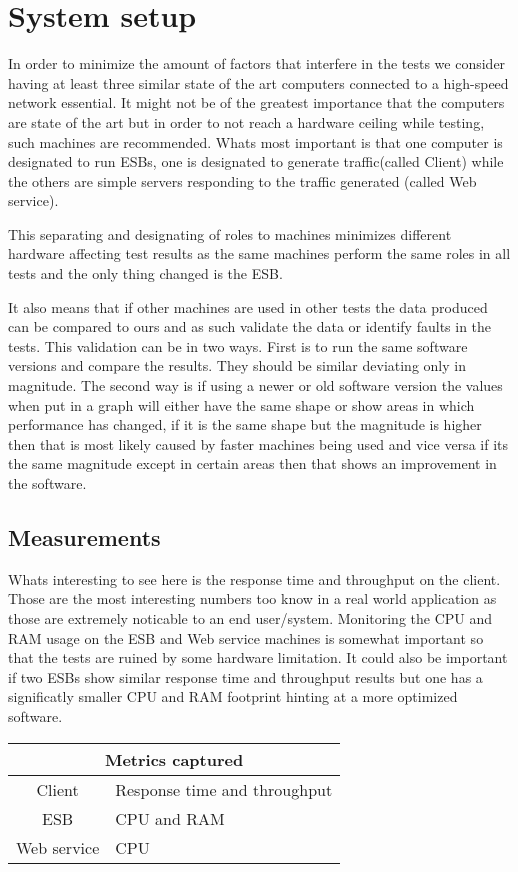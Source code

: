 \documentclass[11pt]{article} %
\begin{document}
\section{System setup}
 In order to minimize the amount of factors that interfere in the tests we consider having at least three similar state of the art computers connected to a high-speed network essential.
It might not be of the greatest importance that the computers are state of the art but in order to not reach a hardware ceiling while testing, such machines are recommended. Whats most important is that one computer is designated to run ESBs, one is designated to generate traffic(called Client) while the others are simple servers responding to the traffic generated (called Web service). 

This separating and designating of roles to machines minimizes different hardware affecting test results as the same machines perform the same roles in all tests and the only thing changed is the ESB. 

It also means that if other machines are used in other tests the data produced can be compared to ours and as such validate the data or identify faults in the tests. This validation can be in two ways. First is to run the same software versions and compare the results. They should be similar deviating only in magnitude. The second way is if using a newer or old software version the values when put in a graph will either have the same shape or show areas in which performance has changed, if it is the same shape but the magnitude is higher then that is most likely caused by faster machines being used and vice versa if its the same magnitude except in certain areas then that shows an improvement in the software.

\subsection{Measurements}
Whats interesting to see here is the response time and throughput on the client. Those are the most interesting numbers too know in a real world application as those are extremely noticable to an end user/system. Monitoring the CPU and RAM usage on the ESB and Web service machines is somewhat important so that the tests are ruined by some hardware limitation. It could also be important if two ESBs show similar response time and throughput results but one has a significatly smaller CPU and RAM footprint hinting at a more optimized software.

\begin{tabular}{| c | l |}
	\hline
	\multicolumn{2}{|c|}{Metrics captured} \\
	\hline
	Client & Response time and throughput \\ \hline
	ESB & CPU and RAM \\ \hline
	Web service &  CPU \\ \hline
\end{tabular}
\end{document}
